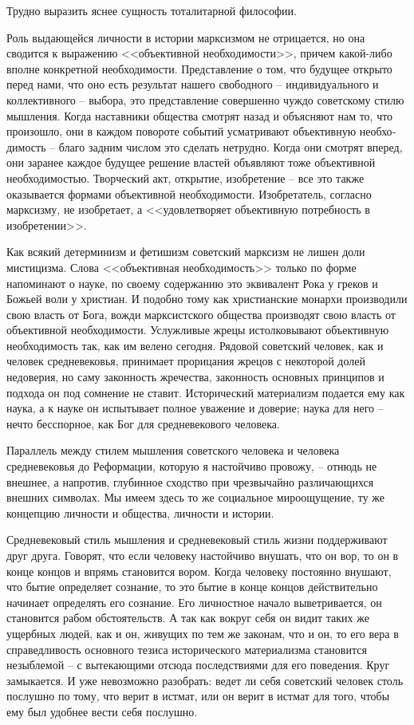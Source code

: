 \documentclass{book}
\begin{document}
Трудно выразить яснее сущность тоталитарной философии.

Роль выдающейся личности в истории марксизмом не отри­цается, но она сводится к выражению <<объективной необхо­димости>>, причем 
какой-либо вполне конкретной необходи­мости. Представление о том, что будущее открыто перед нами, что оно есть результат нашего 
свободного -- индивидуального и коллективного -- выбора, это представление совершенно чуждо советскому стилю мышления. Когда 
наставники общества смотрят назад и объясняют нам то, что произошло, они в каждом повороте событий усматривают объективную 
необхо­димость -- благо задним числом это сделать нетрудно. Когда они смотрят вперед, они заранее каждое будущее решение властей 
объявляют тоже объективной необходимостью. Твор­ческий акт, открытие, изобретение -- все это также оказывается формами 
объективной необходимости. Изобретатель, согласно марксизму, не изобретает, а <<удовлетворяет объективную потребность в 
изобретении>>.

Как всякий детерминизм и фетишизм советский марксизм не лишен доли мистицизма. Слова <<объективная необходимость>> только по форме 
напоминают о науке, по своему содержанию это эквивалент Рока у греков и Божьей воли у христиан. И подобно тому как христианские 
монархи производили свою власть от Бога, вожди марксистского общества производят свою власть от объективной необходимости. 
Услужливые жрецы истолковывают объективную необходимость так, как им велено сегодня. Рядовой советский человек, как и человек 
средневековья, принимает прорицания жрецов с некоторой долей недоверия, но саму законность жречества, законность основных 
принципов и подхода он под сомнение не ставит. Исторический материализм подается ему как наука, а к науке он испытывает полное 
уважение и доверие; наука для него -- нечто бесспорное, как Бог для средневекового человека.

Параллель между стилем мышления советского человека и человека средневековья до Реформации, которую я настойчиво провожу, -- 
отнюдь не внешнее, а напротив, глубинное сходст­во при чрезвычайно различающихся внешних символах. Мы имеем здесь то же 
социальное мироощущение, ту же концепцию личности и общества, личности и истории.

Средневековый стиль мышления и средневековый стиль жизни поддерживают друг друга. Говорят, что если человеку настойчиво внушать, 
что он вор, то он в конце концов и впрямь становится вором. Когда человеку постоянно внушают, что бытие определяет сознание, то 
это бытие в конце концов действительно начинает определять его сознание. Его личностное начало выветривается, он становится 
рабом обстоятельств. А так как вокруг себя он видит таких же ущербных людей, как и он, живущих по тем же законам, что и он, то 
его вера в справедливость основного тезиса исторического материализма становится незыблемой -- с вытекающими отсюда 
последствиями для его поведения. Круг замыкается. И уже невозможно разобрать: ведет ли себя советский человек столь послушно по­
тому, что верит в истмат, или он верит в истмат для того, чтобы ему был удобнее вести себя послушно.
\end{document}

